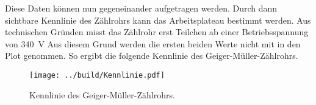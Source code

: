 \noindent Diese Daten können nun gegeneinander aufgetragen werden. Durch dann sichtbare Kennlinie 
des Zählrohrs kann das Arbeitsplateau bestimmt werden. 
Aus technischen Gründen misst das Zählrohr erst Teilchen ab einer Betriebsspannung von \qty{340}{\volt} 
Aus diesem Grund werden die ersten beiden Werte nicht mit in den Plot genommen.
So ergibt die folgende Kennlinie des Geiger-Müller-Zählrohrs.

\begin{figure}[H]
    \centering
    \texttt{[image: ../build/Kennlinie.pdf]}
    \caption{Kennlinie des Geiger-Müller-Zählrohrs.}
\end{figure}





